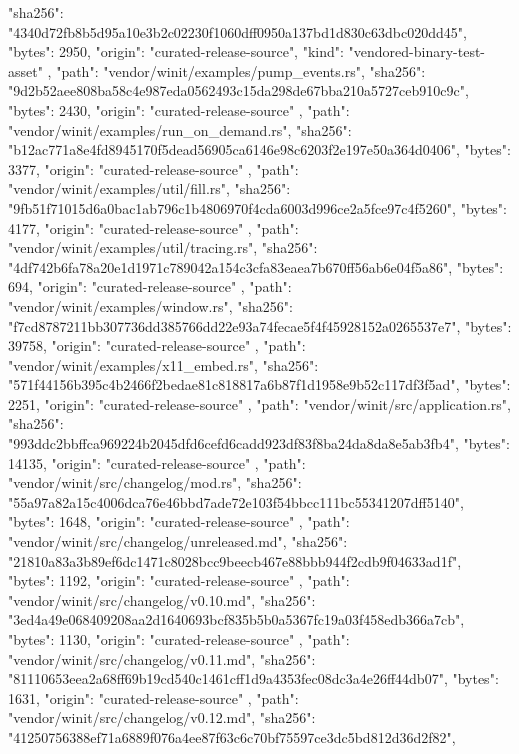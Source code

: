 {{      "sha256": "4340d72fb8b5d95a10e3b2c02230f1060dff0950a137bd1d830c63dbc020dd45",
      "bytes": 2950,
      "origin": "curated-release-source",
      "kind": "vendored-binary-test-asset"
    },
    {
      "path": "vendor/winit/examples/pump_events.rs",
      "sha256": "9d2b52aee808ba58c4e987eda0562493c15da298de67bba210a5727ceb910c9c",
      "bytes": 2430,
      "origin": "curated-release-source"
    },
    {
      "path": "vendor/winit/examples/run_on_demand.rs",
      "sha256": "b12ac771a8e4fd8945170f5dead56905ca6146e98c6203f2e197e50a364d0406",
      "bytes": 3377,
      "origin": "curated-release-source"
    },
    {
      "path": "vendor/winit/examples/util/fill.rs",
      "sha256": "9fb51f71015d6a0bac1ab796c1b4806970f4cda6003d996ce2a5fce97c4f5260",
      "bytes": 4177,
      "origin": "curated-release-source"
    },
    {
      "path": "vendor/winit/examples/util/tracing.rs",
      "sha256": "4df742b6fa78a20e1d1971c789042a154c3cfa83eaea7b670ff56ab6e04f5a86",
      "bytes": 694,
      "origin": "curated-release-source"
    },
    {
      "path": "vendor/winit/examples/window.rs",
      "sha256": "f7cd8787211bb307736dd385766dd22e93a74fecae5f4f45928152a0265537e7",
      "bytes": 39758,
      "origin": "curated-release-source"
    },
    {
      "path": "vendor/winit/examples/x11_embed.rs",
      "sha256": "571f44156b395c4b2466f2bedae81c818817a6b87f1d1958e9b52c117df3f5ad",
      "bytes": 2251,
      "origin": "curated-release-source"
    },
    {
      "path": "vendor/winit/src/application.rs",
      "sha256": "993ddc2bbffca969224b2045dfd6cefd6cadd923df83f8ba24da8da8e5ab3fb4",
      "bytes": 14135,
      "origin": "curated-release-source"
    },
    {
      "path": "vendor/winit/src/changelog/mod.rs",
      "sha256": "55a97a82a15c4006dca76e46bbd7ade72e103f54bbcc111bc55341207dff5140",
      "bytes": 1648,
      "origin": "curated-release-source"
    },
    {
      "path": "vendor/winit/src/changelog/unreleased.md",
      "sha256": "21810a83a3b89ef6dc1471c8028bcc9beecb467e88bbb944f2cdb9f04633ad1f",
      "bytes": 1192,
      "origin": "curated-release-source"
    },
    {
      "path": "vendor/winit/src/changelog/v0.10.md",
      "sha256": "3ed4a49e068409208aa2d1640693bcf835b5b0a5367fc19a03f458edb366a7cb",
      "bytes": 1130,
      "origin": "curated-release-source"
    },
    {
      "path": "vendor/winit/src/changelog/v0.11.md",
      "sha256": "81110653eea2a68ff69b19cd540c1461cff1d9a4353fec08dc3a4e26ff44db07",
      "bytes": 1631,
      "origin": "curated-release-source"
    },
    {
      "path": "vendor/winit/src/changelog/v0.12.md",
      "sha256": "41250756388ef71a6889f076a4ee87f63c6c70bf75597ce3dc5bd812d36d2f82",
}}
